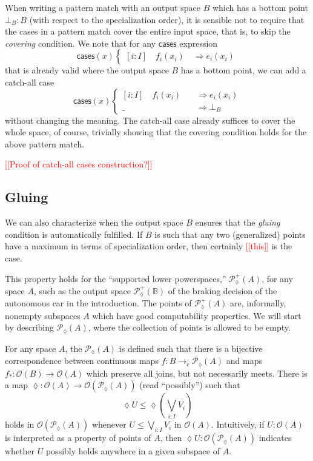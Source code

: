 \documentclass[conference]{IEEEtran}
\newcommand{\PLower}{\mathcal{P}_\lozenge}
\newcommand{\cto}{\to_c}
\newcommand{\Open}[1]{\mathcal{O}({#1})}
\newcommand{\bool}{\mathbb{B}}
\newcommand{\wildcard}{\_}
\newcommand{\Branch}{\Rightarrow}
\newcommand{\note}[1]{\textcolor{red}{[[{#1}]]}}
\begin{document}
When writing a pattern match with an output space $B$ which has a bottom point $\bot_B : B$ (with respect to the specialization order), it is sensible not to require that the cases in a pattern match cover the entire input space, that is, to skip the \emph{covering} condition. We note that for any $\mathsf{cases}$ expression
\[
\mathsf{cases}(x)
\begin{cases}
[i : I] \quad f_i(x_i) \quad \Branch e_i(x_i)
\end{cases}
\]
that is already valid where the output space $B$ has a bottom point, we can add a catch-all case
\[
\mathsf{cases}(x)
\begin{cases}
[i : I] \quad f_i(x_i) \quad &\Branch e_i(x_i)
\\ \wildcard \quad &\Branch \bot_B
\end{cases}
\]
without changing the meaning. The catch-all case already suffices to cover the whole space, of course, trivially showing that the covering condition holds for the above pattern match.

\note{Proof of catch-all cases construction?}

\subsection{Gluing}

We can also characterize when the output space $B$ ensures that the \emph{gluing} condition is automatically fulfilled. If $B$ is such that any two (generalized) points have a maximum in terms of specialization order, then certainly \note{this} is the case.

This property holds for the ``supported lower powerspaces,'' $\PLower^+(A)$, for any space $A$, such as the output space $\PLower^+(\bool)$ of the braking decision of the autonomous car in the introduction. The points of $\PLower^+(A)$ are, informally, nonempty subspaces $A$ which have good computability properties. We will start by describing $\PLower(A)$, where the collection of points is allowed to be empty.

For any space $A$, the $\PLower(A)$ is defined such that there is a bijective correspondence between continuous maps $f : B \cto \PLower(A)$ and maps $f_* : \Open{B} \to \Open{A}$ which preserve all joins, but not necessarily meets. There is a map $\lozenge : \Open{A} \to \Open{\PLower(A)}$ (read ``possibly'') such that
\[
\lozenge U \le \lozenge \left( \bigvee_{i : I} V_i \right)
\]
holds in $\Open{\PLower(A)}$ whenever $U \le \bigvee_{i : I} V_i$ in $\Open{A}$. Intuitively, if $U : \Open{A}$ is interpreted as a property of points of $A$, then $\lozenge U : \Open{\PLower(A)}$ indicates whether $U$ possibly holds anywhere in a given subspace of $A$.
\end{document}
